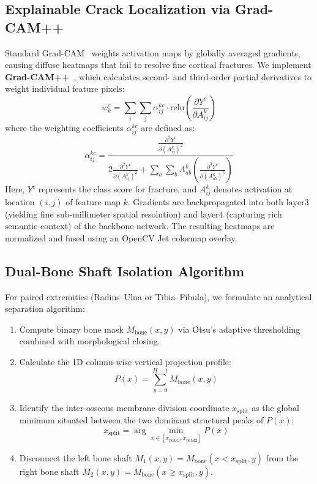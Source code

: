 \documentclass[journal]{IEEEtran}
\begin{document}
\subsection{Explainable Crack Localization via Grad-CAM++}
Standard Grad-CAM~\cite{selvaraju2017grad} weights activation maps by globally averaged gradients, causing diffuse heatmaps that fail to resolve fine cortical fractures. We implement \textbf{Grad-CAM++}~\cite{chattopadhay2018gradcam++}, which calculates second- and third-order partial derivatives to weight individual feature pixels:
\begin{equation}
    w_k^c = \sum_{i}\sum_{j} \alpha_{ij}^{kc} \cdot \text{relu}\left(\frac{\partial Y^c}{\partial A_{ij}^k}\right)
\end{equation}
where the weighting coefficients $\alpha_{ij}^{kc}$ are defined as:
\begin{equation}
    \alpha_{ij}^{kc} = \frac{\frac{\partial^2 Y^c}{\partial (A_{ij}^k)^2}}{2 \frac{\partial^2 Y^c}{\partial (A_{ij}^k)^2} + \sum_{a}\sum_{b} A_{ab}^k \left(\frac{\partial^3 Y^c}{\partial (A_{ab}^k)^3}\right)}
\end{equation}
Here, $Y^c$ represents the class score for fracture, and $A_{ij}^k$ denotes activation at location $(i, j)$ of feature map $k$. Gradients are backpropagated into both $\text{layer3}$ (yielding fine sub-millimeter spatial resolution) and $\text{layer4}$ (capturing rich semantic context) of the backbone network. The resulting heatmaps are normalized and fused using an OpenCV Jet colormap overlay.

\subsection{Dual-Bone Shaft Isolation Algorithm}
For paired extremities (Radius--Ulna or Tibia--Fibula), we formulate an analytical separation algorithm:
\begin{enumerate}
    \item Compute binary bone mask $M_{\text{bone}}(x, y)$ via Otsu's adaptive thresholding combined with morphological closing.
    \item Calculate the 1D column-wise vertical projection profile:
    \begin{equation}
        P(x) = \sum_{y=0}^{H-1} M_{\text{bone}}(x, y)
    \end{equation}
    \item Identify the inter-osseous membrane division coordinate $x_{\text{split}}$ as the global minimum situated between the two dominant structural peaks of $P(x)$:
    \begin{equation}
        x_{\text{split}} = \arg\min_{x \in [x_{\text{peak1}}, x_{\text{peak2}}]} P(x)
    \end{equation}
    \item Disconnect the left bone shaft $M_1(x, y) = M_{\text{bone}}(x < x_{\text{split}}, y)$ from the right bone shaft $M_2(x, y) = M_{\text{bone}}(x \ge x_{\text{split}}, y)$.
\end{enumerate}
\end{document}
